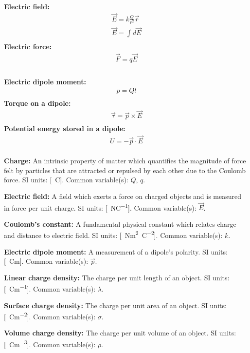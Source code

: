 \newpage
\begin{importantEquations}
\medskip
\begin{multicols}{2}
\textbf{Electric field:}
\begin{align*}
\vec E = k \frac{Q}{r^2}\vec r \\
\vec E = \int d \vec E \\
\end{align*}
\textbf{Electric force:}
\begin{align*}
\vec F = q \vec E \\
\end{align*}
\columnbreak
\\
\textbf{Electric dipole moment:}
\begin{align*}
p = Ql \\
\end{align*}
\textbf{Torque on a dipole:}
\begin{align*}
\vec \tau = \vec p \times \vec E \\
\end{align*}
\textbf{Potential energy stored in a dipole:}
\begin{align*}
U = -\vec p \cdot \vec E \\
\end{align*}
\medskip
\end{multicols}
\end{importantEquations}


\begin{definitions}
	\textbf{Charge:} An intrinsic property of matter which quantifies the magnitude of force felt by particles that are attracted or repulsed by each other due to the Coulomb force. SI units: [\SI{}{C}]. Common variable(s): $Q$, $q$.
	\medskip
	\item \textbf{Electric field:} A field which exerts a force on charged objects and is measured in force per unit charge. SI units: [\SI{}{NC^{-1}}]. Common variable(s): $\vec E$.
	\medskip
	\item \textbf{Coulomb's constant:} A fundamental physical constant which relates charge and distance to electric field. SI units: [\SI{}{Nm^2C^{-2}}]. Common variable(s): $k$.
	\medskip
	\item \textbf{Electric dipole moment:} A measurement of a dipole's polarity. SI units: [\SI{}{Cm}]. Common variable(s): $\vec p$.
	\medskip
	\item \textbf{Linear charge density:} The charge per unit length of an object. SI units: [\SI{}{Cm^{-1}}]. Common variable(s): $\lambda$.
	\medskip
	\item \textbf{Surface charge density:} The charge per unit area of an object. SI units: [\SI{}{Cm^{-2}}]. Common variable(s): $\sigma$.
	\medskip
	\item \textbf{Volume charge density:} The charge per unit volume of an object. SI units: [\SI{}{Cm^{-3}}]. Common variable(s): $\rho$.
	
\end{definitions}


